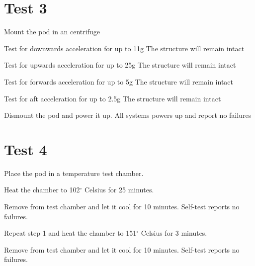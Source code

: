 \documentclass[Main]{subfiles}
\begin{document}
\newpage
\section{Test 3}


\begin{TestCaseIntro}
\end{TestCaseIntro}

\begin{TestCase}
\TC
{Mount the pod in an centrifuge}
{}

\TC
{Test for downwards acceleration for up to 11g}
{The structure will remain intact}

\TC
{Test for upwards acceleration for up to 25g}
{The structure will remain intact}

\TC
{Test for forwards acceleration for up to 5g}
{The structure will remain intact}

\TC
{Test for aft acceleration for up to 2.5g}
{The structure will remain intact}

\TC
{Dismount the pod and power it up.}
{All systems powers up and report no failures}
\\
\end{TestCase}


\newpage
\section{Test 4}


\begin{TestCaseIntro}
\end{TestCaseIntro}

\begin{TestCase}
\TC
{Place the pod in a temperature test chamber.}
{}


\TC
{Heat the chamber to 102$^\circ$ Celsius for 25 minutes.}
{}


\TC
{Remove from test chamber and let it cool for 10 minutes.}
{Self-test reports no failures.}

\TC
{Repeat step 1 and heat the chamber to 151$^\circ$ Celsius for 3 minutes.} 
{}

\TC
{Remove from test chamber and let it cool for 10 minutes.}
{Self-test reports no failures.}

\\
\end{TestCase}
\end{document}
